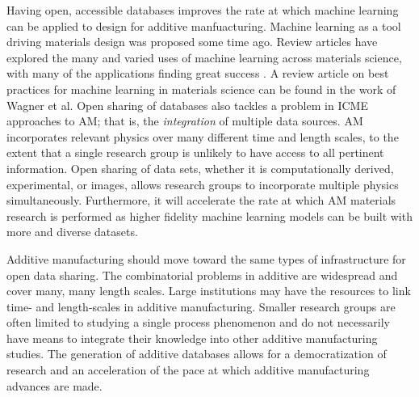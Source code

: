 Having open, accessible databases improves the rate at which machine learning can be applied to design for additive manfuacturing. Machine learning as a tool driving materials design was proposed some time ago. Review articles have explored the many and varied uses of machine learning across materials science, with many of the applications finding great success \cite{Kalidindi2016, Ramprasad2017, Gubernatis2018}. A review article on best practices for machine learning in materials science can be found in the work of Wagner et al\cite{Wagner2016}. Open sharing of databases also tackles a problem in ICME approaches to AM; that is, the \textit{integration} of multiple data sources. AM incorporates relevant physics over many different time and length scales, to the extent that a single research group is unlikely to have access to all pertinent information. Open sharing of data sets, whether it is computationally derived, experimental, or images, allows research groups to incorporate multiple physics simultaneously. Furthermore, it will accelerate the rate at which AM materials research is performed as higher fidelity machine learning models can be built with more and diverse datasets.

Additive manufacturing should move toward the same types of infrastructure for open data sharing. The combinatorial problems in additive are widespread and cover many, many length scales. Large institutions may have the resources to link time- and length-scales in additive manufacturing. Smaller research groups are often limited to studying a single process phenomenon and do not necessarily have means to integrate their knowledge into other additive manufacturing studies. The generation of additive databases allows for a democratization of research and an acceleration of the pace at which additive manufacturing advances are made.
